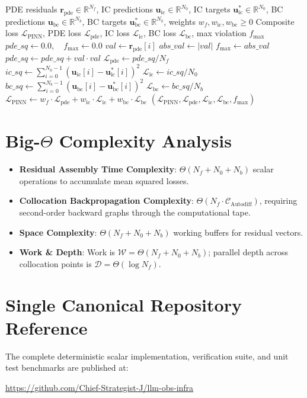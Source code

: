 \documentclass[11pt,a4paper]{article}
\theoremstyle{definition}
\begin{document}
\begin{algorithm}[H]
\caption{Physics-Informed Neural Network Residual Evaluation and Loss Assembly}
\begin{algorithmic}[1]
\Require PDE residuals $\mathbf{r}_{\text{pde}} \in \mathbb{R}^{N_f}$, IC predictions $\mathbf{u}_{\text{ic}} \in \mathbb{R}^{N_0}$, IC targets $\mathbf{u}_{\text{ic}}^* \in \mathbb{R}^{N_0}$, BC predictions $\mathbf{u}_{\text{bc}} \in \mathbb{R}^{N_b}$, BC targets $\mathbf{u}_{\text{bc}}^* \in \mathbb{R}^{N_b}$, weights $w_f, w_{\text{ic}}, w_{\text{bc}} \ge 0$
\Ensure Composite loss $\mathcal{L}_{\text{PINN}}$, PDE loss $\mathcal{L}_{\text{pde}}$, IC loss $\mathcal{L}_{\text{ic}}$, BC loss $\mathcal{L}_{\text{bc}}$, max violation $f_{\max}$
\State $pde\_sq \gets 0.0, \quad f_{\max} \gets 0.0$
    \State $val \gets \mathbf{r}_{\text{pde}}[i]$
    \State $abs\_val \gets |val|$
     \State $f_{\max} \gets abs\_val$ \EndIf
    \State $pde\_sq \gets pde\_sq + val \cdot val$
\EndFor
\State $\mathcal{L}_{\text{pde}} \gets pde\_sq / N_f$
\State $ic\_sq \gets \sum_{i=0}^{N_0-1} (\mathbf{u}_{\text{ic}}[i] - \mathbf{u}_{\text{ic}}^*[i])^2$
\State $\mathcal{L}_{\text{ic}} \gets ic\_sq / N_0$
\State $bc\_sq \gets \sum_{i=0}^{N_b-1} (\mathbf{u}_{\text{bc}}[i] - \mathbf{u}_{\text{bc}}^*[i])^2$
\State $\mathcal{L}_{\text{bc}} \gets bc\_sq / N_b$
\State $\mathcal{L}_{\text{PINN}} \gets w_f \cdot \mathcal{L}_{\text{pde}} + w_{\text{ic}} \cdot \mathcal{L}_{\text{ic}} + w_{\text{bc}} \cdot \mathcal{L}_{\text{bc}}$
\State \Return $(\mathcal{L}_{\text{PINN}}, \mathcal{L}_{\text{pde}}, \mathcal{L}_{\text{ic}}, \mathcal{L}_{\text{bc}}, f_{\max})$
\end{algorithmic}
\end{algorithm}

\section{Big-$\Theta$ Complexity Analysis}

\begin{itemize}
    \item \textbf{Residual Assembly Time Complexity}: $\Theta(N_f + N_0 + N_b)$ scalar operations to accumulate mean squared losses.
    \item \textbf{Collocation Backpropagation Complexity}: $\Theta(N_f \cdot \mathcal{C}_{\text{Autodiff}})$, requiring second-order backward graphs through the computational tape.
    \item \textbf{Space Complexity}: $\Theta(N_f + N_0 + N_b)$ working buffers for residual vectors.
    \item \textbf{Work \& Depth}: Work is $\mathcal{W} = \Theta(N_f + N_0 + N_b)$; parallel depth across collocation points is $\mathcal{D} = \Theta(\log N_f)$.
\end{itemize}

\section{Single Canonical Repository Reference}

The complete deterministic scalar implementation, verification suite, and unit test benchmarks are published at:
\begin{center}
\url{https://github.com/Chief-Strategist-J/llm-obs-infra}
\end{center}
\end{document}
